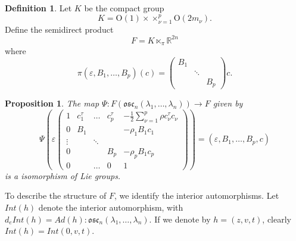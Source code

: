 \documentclass[11pt]{amsart}
\theoremstyle{plain}
\newtheorem{prop}[thm]{Proposition}
\theoremstyle{definition}
\newtheorem{defn}[thm]{Definition}
\theoremstyle{remark}
\begin{document}
\begin{defn} Let $K$ be the compact group 
	$$K= \mathrm{O}(1)\times \times_{\nu=1}^p \mathrm{O}(2m_{\nu}).$$
	Define the semidirect product
	$$F=K\ltimes_{\pi} \mathbb R^{2n}$$
	where 
	$$\pi(\varepsilon, B_1, \hdots, B_p)(c)=\left( \begin{matrix}
	B_1  & & \\
	 & \ddots & \\
	  & & B_p
	\end{matrix} \right) c.
	$$	
	\end{defn}
\begin{prop} The map $\Psi: F(\mathfrak{osc}_n(\lambda_1, \hdots, \lambda_n)) \to F$ given by
	$$\Psi \left( \varepsilon  \left( 
	\begin{matrix} 
	1&	c_1^{\tau}	&\hdots  &c_p^{\tau}   &   -\frac12 \sum_{\nu=1}^p  \rho c_{\nu}^{\tau} c_{\nu}\\
0&	B_1 & & &  - \rho_1 B_1 c_1\\
\vdots &	& \ddots &   &  \\
0&	& & B_p &  - \rho_p B_1 c_p\\
0  & &\hdots  & 0 & 1
	\end{matrix}\right) \right) =(\varepsilon, B_1, \hdots, B_p, c)$$
	is a isomorphism of Lie groups. 
\end{prop}

To describe the structure of $F$, we identify the interior automorphisms. Let $Int(h)$ denote the interior automorphism, with $d_e Int(h)=Ad(h): \mathfrak{osc}_n(\lambda_1, \hdots, \lambda_n)$. If we denote by $h=(z,v,t)$, clearly $Int(h)=Int(0,v,t)$.
\end{document}
